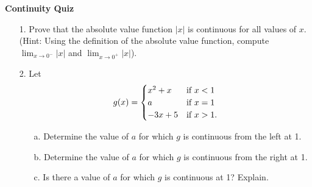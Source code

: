 \documentclass[11pt]{article}
\begin{document}

\centerline{\textbf{\Large{Continuity Quiz}}}

\vspace{0.2in}
 

\begin{enumerate}

\item[1.] Prove that the absolute value function $|x|$ is continuous for all values of $x$. (Hint: Using the definition of the absolute value function, compute $\lim_{x \to 0^-} |x|$ and $\lim_{x \to 0^+} |x|$). 
	
\item[2.] Let $$g(x) = \begin{cases}
	x^2 + x & \textnormal{if } x < 1 \\ a & \textnormal{if } x = 1 \\ -3x + 5 & \textnormal{if } x > 1. 
\end{cases}$$ 
\begin{enumerate}
	\item[a.] Determine the value of $a$ for which $g$ is continuous from the left at 1. 
	\item[b.] Determine the value of $a$ for which $g$ is continuous from the right at 1. 
	\item[c.] Is there a value of $a$ for which $g$ is continuous at 1? Explain.
\end{enumerate}

\end{enumerate}
 
\end{document}
